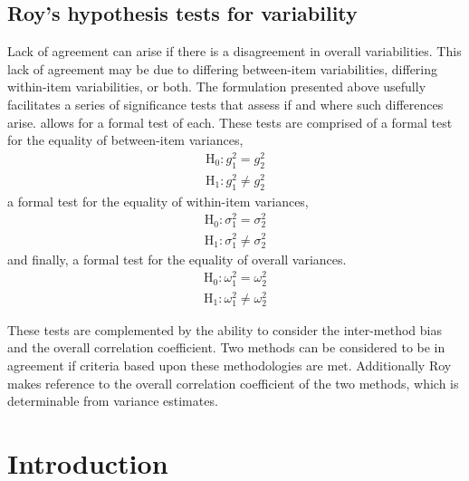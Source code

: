 \documentclass[12pt, a4paper]{report}
\theoremstyle{plain}
\theoremstyle{definition}
\theoremstyle{remark}
\begin{document}
\subsection{Roy's hypothesis tests for variability}
Lack of agreement can arise if there is a disagreement in overall variabilities. This lack of agreement may be due to differing between-item variabilities, differing within-item variabilities, or both. The formulation presented above usefully facilitates a series of significance tests that assess if and where such differences arise. \citet{roy} allows for a formal test of each. These tests are comprised of a formal test for the equality of between-item variances,
\begin{eqnarray*}
	\operatorname{H_0} : g^2_1 = g^2_2 \\
	\operatorname{H_1} : g^2_1 \neq g^2_2
\end{eqnarray*}
a formal test for the equality of within-item variances,
\begin{eqnarray*}
	\operatorname{H_0} : \sigma^2_1 = \sigma^2_2 \\
	\operatorname{H_1} : \sigma^2_1 \neq \sigma^2_2
\end{eqnarray*}
and finally, a formal test for the equality of overall variances.
\begin{eqnarray*}
	\operatorname{H_0} : \omega^2_1 = \omega^2_2 \\
	\operatorname{H_1} : \omega^2_1 \neq \omega^2_2
\end{eqnarray*}

These tests are complemented by the ability to consider the inter-method bias and the overall correlation coefficient.
Two methods can be considered to be in agreement if criteria based upon these methodologies are met. Additionally Roy makes reference to the overall correlation coefficient of the two methods, which is determinable from variance estimates.


		\section{Introduction}
\end{document}
